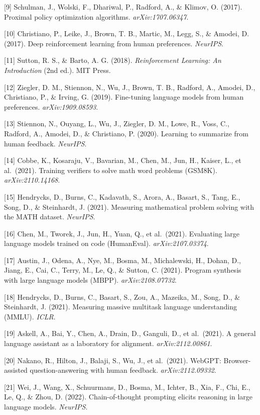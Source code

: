 {[}9{]} Schulman, J., Wolski, F., Dhariwal, P., Radford, A., \& Klimov, O. (2017). Proximal policy optimization algorithms. \emph{arXiv:1707.06347}.

{[}10{]} Christiano, P., Leike, J., Brown, T. B., Martic, M., Legg, S., \& Amodei, D. (2017). Deep reinforcement learning from human preferences. \emph{NeurIPS}.

{[}11{]} Sutton, R. S., \& Barto, A. G. (2018). \emph{Reinforcement Learning: An Introduction} (2nd ed.). MIT Press.

{[}12{]} Ziegler, D. M., Stiennon, N., Wu, J., Brown, T. B., Radford, A., Amodei, D., Christiano, P., \& Irving, G. (2019). Fine-tuning language models from human preferences. \emph{arXiv:1909.08593}.

{[}13{]} Stiennon, N., Ouyang, L., Wu, J., Ziegler, D. M., Lowe, R., Voss, C., Radford, A., Amodei, D., \& Christiano, P. (2020). Learning to summarize from human feedback. \emph{NeurIPS}.

{[}14{]} Cobbe, K., Kosaraju, V., Bavarian, M., Chen, M., Jun, H., Kaiser, L., et al.~(2021). Training verifiers to solve math word problems (GSM8K). \emph{arXiv:2110.14168}.

{[}15{]} Hendrycks, D., Burns, C., Kadavath, S., Arora, A., Basart, S., Tang, E., Song, D., \& Steinhardt, J. (2021). Measuring mathematical problem solving with the MATH dataset. \emph{NeurIPS}.

{[}16{]} Chen, M., Tworek, J., Jun, H., Yuan, Q., et al.~(2021). Evaluating large language models trained on code (HumanEval). \emph{arXiv:2107.03374}.

{[}17{]} Austin, J., Odena, A., Nye, M., Bosma, M., Michalewski, H., Dohan, D., Jiang, E., Cai, C., Terry, M., Le, Q., \& Sutton, C. (2021). Program synthesis with large language models (MBPP). \emph{arXiv:2108.07732}.

{[}18{]} Hendrycks, D., Burns, C., Basart, S., Zou, A., Mazeika, M., Song, D., \& Steinhardt, J. (2021). Measuring massive multitask language understanding (MMLU). \emph{ICLR}.

{[}19{]} Askell, A., Bai, Y., Chen, A., Drain, D., Ganguli, D., et al.~(2021). A general language assistant as a laboratory for alignment. \emph{arXiv:2112.00861}.

{[}20{]} Nakano, R., Hilton, J., Balaji, S., Wu, J., et al.~(2021). WebGPT: Browser-assisted question-answering with human feedback. \emph{arXiv:2112.09332}.

{[}21{]} Wei, J., Wang, X., Schuurmans, D., Bosma, M., Ichter, B., Xia, F., Chi, E., Le, Q., \& Zhou, D. (2022). Chain-of-thought prompting elicits reasoning in large language models. \emph{NeurIPS}.

